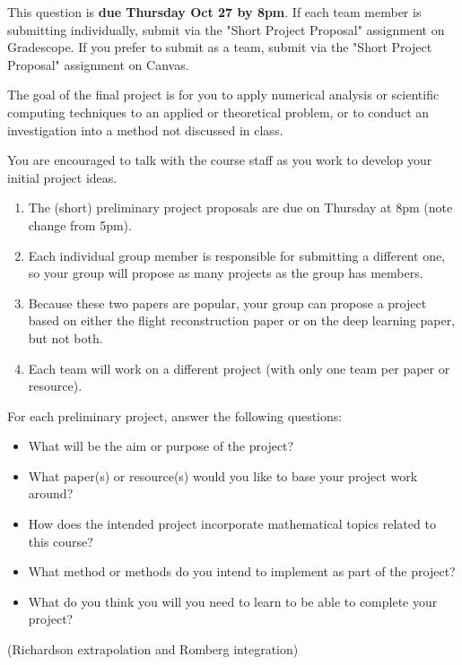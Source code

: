 \documentclass[12pt,letterpaper,noanswers]{exam}
\begin{document}
\begin{questions}
\item This question is \textbf{due Thursday Oct 27 by 8pm}.  If each team member is submitting individually, submit via the "Short Project Proposal" assignment on Gradescope.  If you prefer to submit as a team, submit via the "Short Project Proposal" assignment on Canvas.

The goal of the final project is for you to apply numerical analysis or scientific computing techniques to an applied or theoretical problem, or to conduct an investigation into a method not discussed in class.

{\large You are encouraged to talk with the course staff as you work to develop your initial project ideas.}

\begin{enumerate}
\itemsep0pt
    \item The (short) preliminary project proposals are due on Thursday at 8pm (note change from 5pm).
    \item Each individual group member is responsible for submitting a different one, so your group will propose as many projects as the group has members.
    \item Because these two papers are popular, your group can propose a project based on either the flight reconstruction paper or on the deep learning paper, but not both.
    \item Each team will work on a different project (with only one team per paper or resource).
\end{enumerate}


\noindent For each preliminary project, answer the following questions:
\begin{itemize}
\itemsep0pt
\item What will be the aim or purpose of the project?
\item What paper(s) or resource(s) would you like to base your project work around?
\item How does the intended project incorporate mathematical topics related to this course?
\item What method or methods do you intend to implement as part of the project?
\item What do you think you will you need to learn to be able to complete your project?
\end{itemize}



\item (Richardson extrapolation and Romberg integration)


\end{questions}
\end{document}
